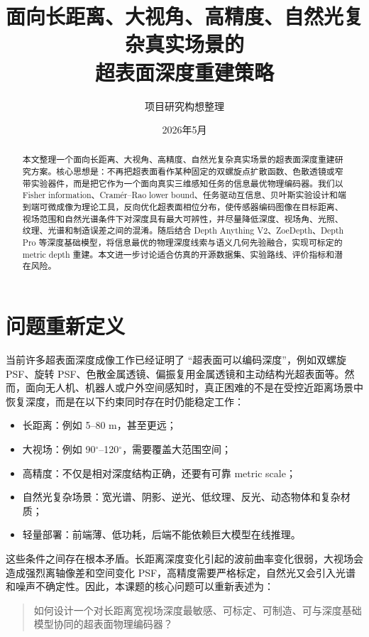 \documentclass[11pt,a4paper,fontset=none]{ctexart}
\title{\bfseries 面向长距离、大视角、高精度、自然光复杂真实场景的\\超表面深度重建策略}
\author{项目研究构想整理}
\date{2026年5月}
\begin{document}
\maketitle
\tableofcontents
\newpage

\begin{abstract}
本文整理一个面向长距离、大视角、高精度、自然光复杂真实场景的超表面深度重建研究方案。核心思想是：不再把超表面看作某种固定的双螺旋点扩散函数、色散透镜或窄带实验器件，而是把它作为一个面向真实三维感知任务的信息最优物理编码器。我们以 Fisher information、Cramér--Rao lower bound、任务驱动互信息、贝叶斯实验设计和端到端可微成像为理论工具，反向优化超表面相位分布，使传感器编码图像在目标距离、视场范围和自然光谱条件下对深度具有最大可辨性，并尽量降低深度、视场角、光照、纹理、光谱和制造误差之间的混淆。随后结合 Depth Anything V2、ZoeDepth、Depth Pro 等深度基础模型，将信息最优的物理深度线索与语义几何先验融合，实现可标定的 metric depth 重建。本文进一步讨论适合仿真的开源数据集、实验路线、评价指标和潜在风险。
\end{abstract}

\section{问题重新定义}

当前许多超表面深度成像工作已经证明了 ``超表面可以编码深度''，例如双螺旋 PSF、旋转 PSF、色散金属透镜、偏振复用金属透镜和主动结构光超表面等。然而，面向无人机、机器人或户外空间感知时，真正困难的不是在受控近距离场景中恢复深度，而是在以下约束同时存在时仍能稳定工作：

\begin{itemize}
  \item 长距离：例如 5--80 m，甚至更远；
  \item 大视场：例如 90$^\circ$--120$^\circ$，需要覆盖大范围空间；
  \item 高精度：不仅是相对深度结构正确，还要有可靠 metric scale；
  \item 自然光复杂场景：宽光谱、阴影、逆光、低纹理、反光、动态物体和复杂材质；
  \item 轻量部署：前端薄、低功耗，后端不能依赖巨大模型在线推理。
\end{itemize}

这些条件之间存在根本矛盾。长距离深度变化引起的波前曲率变化很弱，大视场会造成强烈离轴像差和空间变化 PSF，高精度需要严格标定，自然光又会引入光谱和噪声不确定性。因此，本课题的核心问题可以重新表述为：

\begin{quote}
如何设计一个对长距离宽视场深度最敏感、可标定、可制造、可与深度基础模型协同的超表面物理编码器？
\end{quote}
\end{document}
